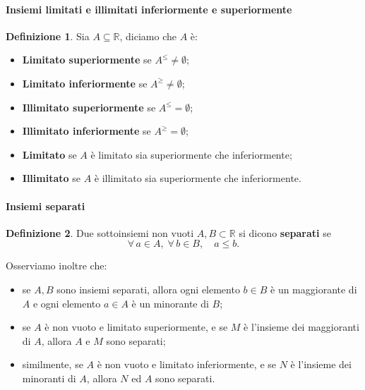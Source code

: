 \documentclass{article}
\theoremstyle{plain}
\theoremstyle{definition}
\newtheorem{defn}{Definizione}[section]
\theoremstyle{remark}
\begin{document}
\vspace{10pt}

\paragraph{Insiemi limitati e illimitati inferiormente e superiormente}
\begin{bxthm}
\begin{defn}
    Sia $A\subseteq\mathbb{R}$, diciamo che $A$ è:
    \begin{itemize}
        \item \textbf{Limitato superiormente} se $A^{\leq}\neq \emptyset$;
        \item \textbf{Limitato inferiormente} se $A^{\geq}\neq \emptyset$;
        \item \textbf{Illimitato superiormente} se $A^{\leq}=\emptyset$;
        \item \textbf{Illimitato inferiormente} se $A^{\geq}=\emptyset$;
        \item \textbf{Limitato} se $A$ è limitato sia superiormente che inferiormente;
        \item \textbf{Illimitato} se $A$ è illimitato sia superiormente che inferiormente.
    \end{itemize}
\end{defn}
\end{bxthm}

\vspace{10pt}

\paragraph{Insiemi separati}
\begin{bxthm}
\begin{defn}
    Due sottoinsiemi non vuoti $A,B\subset\mathbb{R}$ si dicono \textbf{separati} se 
    \[\forall\,a\in A,\;\forall\,b\in B,\quad a\leq b.\]
\end{defn}
\end{bxthm}

\vspace{10pt}

Osserviamo inoltre che:
\begin{itemize}
    \item se $A, B$ sono insiemi separati, allora ogni elemento $b\in B$ è un maggiorante di $A$
    e ogni elemento $a\in A$ è un minorante di $B$;
    \item se $A$ è non vuoto e limitato superiormente, e se $M$ è l'insieme dei maggioranti di
    $A$, allora $A$ e $M$ sono separati;
    \item similmente, se $A$ è non vuoto e limitato inferiormente, e se $N$ è l'insieme dei
    minoranti di $A$, allora $N$ ed $A$ sono separati.
\end{itemize}
\end{document}
